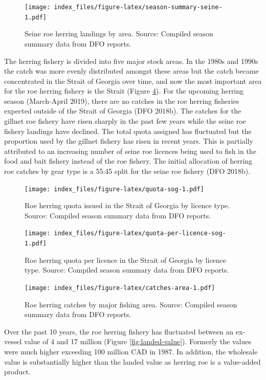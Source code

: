 \documentclass[]{article}
\theoremstyle{definition}
\theoremstyle{definition}
\theoremstyle{definition}
\theoremstyle{remark}
\begin{document}
\begin{figure}
\centering
\texttt{[image: index\_files/figure-latex/season-summary-seine-1.pdf]}
\caption{\label{fig:season-summary-seine}Seine roe herring landings by area.
Source: Compiled season summary data from DFO reports.}
\end{figure}

The herring fishery is divided into five major stock areas. In the 1980s
and 1990s the catch was more evenly distributed amongst these areas but
the catch became concentrated in the Strait of Georgia over time, and
now the most important area for the roe herring fishery is the Strait
(Figure \ref{fig:catches-area}). For the upcoming herring season
(March-April 2019), there are no catches in the roe herring fisheries
expected outside of the Strait of Georgia (DFO 2018b). The catches for
the gillnet roe fishery have risen sharply in the past few years while
the seine roe fishery landings have declined. The total quota assigned
has fluctuated but the proportion used by the gillnet fishery has risen
in recent years. This is partially attributed to an increasing number of
seine roe licences being used to fish in the food and bait fishery
instead of the roe fishery. The initial allocation of herring roe
catches by gear type is a 55:45 split for the seine roe fishery (DFO
2018b).

\begin{figure}
\centering
\texttt{[image: index\_files/figure-latex/quota-sog-1.pdf]}
\caption{\label{fig:quota-sog}Roe herring quota issued in the Strait of
Georgia by licence type. Source: Compiled season summary data from DFO
reports.}
\end{figure}

\begin{figure}
\centering
\texttt{[image: index\_files/figure-latex/quota-per-licence-sog-1.pdf]}
\caption{\label{fig:quota-per-licence-sog}Roe herring quota per licence in
the Strait of Georgia by licence type. Source: Compiled season summary
data from DFO reports.}
\end{figure}

\begin{figure}
\centering
\texttt{[image: index\_files/figure-latex/catches-area-1.pdf]}
\caption{\label{fig:catches-area}Roe herring catches by major fishing area.
Source: Compiled season summary data from DFO reports.}
\end{figure}

Over the past 10 years, the roe herring fishery has fluctuated between
an ex-vessel value of 4 and 17 million (Figure \ref{fig:landed-value}).
Formerly the values were much higher exceeding 100 million CAD in 1987.
In addition, the wholesale value is substantially higher than the landed
value as herring roe is a value-added product.
\end{document}
